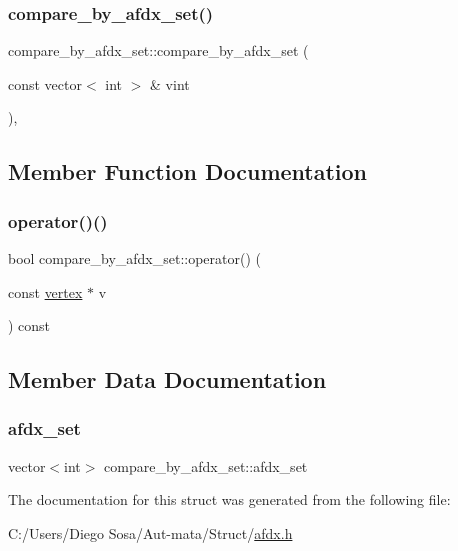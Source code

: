 \subsubsection{\texorpdfstring{compare\+\_\+by\+\_\+afdx\+\_\+set()}{compare\_by\_afdx\_set()}}
{\footnotesize\ttfamily compare\+\_\+by\+\_\+afdx\+\_\+set\+::compare\+\_\+by\+\_\+afdx\+\_\+set (\begin{DoxyParamCaption}\item[{const vector$<$ int $>$ \&}]{vint }\end{DoxyParamCaption})\hspace{0.3cm}{\ttfamily [inline]}, {\ttfamily [explicit]}}



\subsection{Member Function Documentation}
\hypertarget{structcompare__by__afdx__set_a18fa08904cc5f451f09d177d1dae9cdb}{}\label{structcompare__by__afdx__set_a18fa08904cc5f451f09d177d1dae9cdb} 
\subsubsection{\texorpdfstring{operator()()}{operator()()}}
{\footnotesize\ttfamily bool compare\+\_\+by\+\_\+afdx\+\_\+set\+::operator() (\begin{DoxyParamCaption}\item[{const \hyperlink{structvertex}{vertex} $\ast$}]{v }\end{DoxyParamCaption}) const\hspace{0.3cm}{\ttfamily [inline]}}



\subsection{Member Data Documentation}
\hypertarget{structcompare__by__afdx__set_a1e8f179c48ce4510d346cbde1f7c2a6f}{}\label{structcompare__by__afdx__set_a1e8f179c48ce4510d346cbde1f7c2a6f} 
\subsubsection{\texorpdfstring{afdx\+\_\+set}{afdx\_set}}
{\footnotesize\ttfamily vector$<$int$>$ compare\+\_\+by\+\_\+afdx\+\_\+set\+::afdx\+\_\+set}



The documentation for this struct was generated from the following file\+:\begin{DoxyCompactItemize}
\item 
C\+:/\+Users/\+Diego Sosa/\+Aut-\/mata/\+Struct/\hyperlink{afdx_8h}{afdx.\+h}\end{DoxyCompactItemize}
